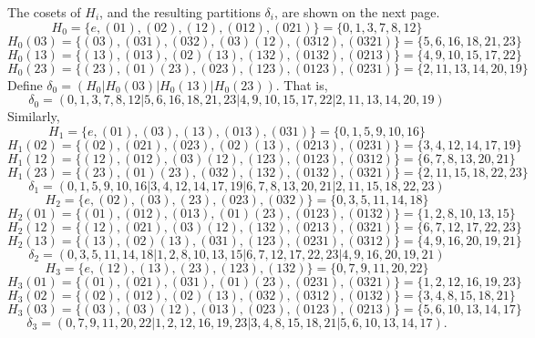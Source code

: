 The cosets of $H_i$, and the resulting partitions $\delta_i$, are shown on the
next page. 
\newpage
\[
H_0 = \{e, (01), (02), (12), (012), (021)\} = \{0, 1, 3, 7, 8, 12\}
\]
\[
H_0(03) = \{(03), (031), (032), (03)(12), (0312), (0321)\} = \{5,6,16,18,21,23\}
\]
\[
H_0(13) = \{(13), (013), (02)(13), (132), (0132), (0213)\} = \{4,9,10,15,17,22\}
\]
\[
H_0(23) = \{(23), (01)(23), (023), (123), (0123), (0231)\} = \{2,11,13,14,20,19\}
\]
Define $\delta_0 = (H_0|H_0(03)|H_0(13)|H_0(23))$. That is,
\[
\delta_0 = (0, 1, 3, 7, 8, 12|5,6,16,18,21,23|4,9,10,15,17,22|2,11,13,14,20,19)
\]
Similarly,
\[
H_1 = \{e, (01), (03), (13), (013), (031)\} = \{0, 1, 5, 9, 10, 16\}
\]
\[
H_1(02) = \{(02), (021), (023), (02)(13), (0213), (0231)\} = \{3, 4, 12, 14, 17, 19\}
\]
\[
H_1(12) = \{(12), (012), (03)(12), (123), (0123), (0312)\} = \{6, 7, 8, 13, 20, 21\}
\]
\[
H_1(23) = \{(23), (01)(23), (032), (132), (0132), (0321)\} = \{2, 11, 15, 18, 22, 23\}
\]
\[
\delta_1 = (0, 1, 5, 9, 10, 16|3, 4, 12, 14, 17, 19|6, 7, 8, 13, 20, 21|2, 11, 15, 18, 22, 23)
\]
\[
H_2 = \{e, (02), (03), (23), (023), (032)\} = \{0, 3, 5, 11, 14, 18\}
\]
\[
H_2(01) = \{(01), (012), (013), (01)(23), (0123), (0132)\} = \{1,2,8,10,13,15\}
\]
\[
H_2(12) = \{(12), (021), (03)(12), (132), (0213), (0321)\} = \{6,7,12,17,22,23\}
\]
\[
H_2(13) = \{(13), (02)(13), (031), (123), (0231), (0312)\} = \{4,9,16,20,19,21\}
\]
\[
\delta_2 = (0,3,5,11,14,18|1,2,8,10,13,15|6,7,12,17,22,23|4,9,16,20,19,21)
\]
\[
H_3 = \{e, (12), (13), (23), (123), (132)\} = \{0, 7, 9, 11, 20, 22\}
\]
\[
H_3(01) = \{(01), (021), (031), (01)(23), (0231), (0321)\} = \{1,2,12,16,19,23\}
\]
\[
H_3(02) = \{(02), (012), (02)(13), (032), (0312), (0132)\} = \{3,4,8,15,18,21\}
\]
\[
H_3(03) = \{(03), (03)(12), (013), (023), (0123), (0213)\} = \{5,6,10,13,14,17\}
\]
\[
\delta_3 = (0,7,9,11,20,22|1,2,12,16,19,23|3,4,8,15,18,21|5,6,10,13,14,17).
\]

